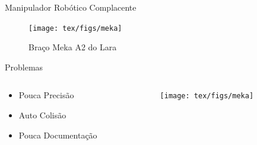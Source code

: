 \documentclass{beamer}
\begin{document}

\begin{frame}{Manipulador Robótico Complacente}
\begin{figure}
    \centering
    \texttt{[image: tex/figs/meka]}
    \caption{Braço Meka A2 do Lara}
    \label{fig:mekainside}
\end{figure}
\end{frame}

\begin{frame}{Problemas}
\begin{columns}
\begin{column}{0.4\textwidth}  %
    \begin{itemize}
        \item Pouca Precisão
        \item Auto Colisão
        \item Pouca Documentação
    \end{itemize}
\end{column}
\begin{column}{0.6\textwidth}
   \begin{figure}
    \centering
    \texttt{[image: tex/figs/meka]}
    \label{fig:mekainside}
\end{figure}
\end{column}
\end{columns}
\end{frame}


\end{document}
